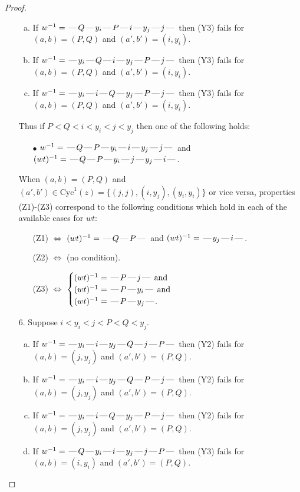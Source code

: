 \documentclass[10pt]{article}
\theoremstyle{definition}
\theoremstyle{definition}
\def\dash{\text{\hspace{0.5mm}---\hspace{0.5mm}}}
\def\Cyc{\mathrm{Cyc}}
\begin{document}
\begin{proof}
\begin{enumerate}
\begin{enumerate}[(a)]
\item If $w^{-1} = \dash Q\dash y_i\dash P\dash i\dash y_j\dash j\dash $ then (Y3) fails for $(a,b)=(P,Q)$ and $(a',b')=(i,y_i)$.
\item If $w^{-1} = \dash y_i\dash Q\dash i\dash y_j\dash P\dash j\dash $ then (Y3) fails for $(a,b)=(P,Q)$ and $(a',b')=(i,y_i)$.
\item If $w^{-1} = \dash y_i\dash i\dash Q\dash y_j\dash P\dash j\dash $ then (Y3) fails for $(a,b)=(P,Q)$ and $(a',b')=(i,y_i)$.
\end{enumerate}
Thus if $P < Q < i < y_i < j < y_j$ then one of the following holds:
\begin{enumerate}
\item[$\bullet$] $w^{-1} = \dash Q\dash P\dash y_i\dash i\dash y_j\dash j\dash $ and $(wt)^{-1} = \dash Q\dash P\dash y_i\dash j\dash y_j\dash i\dash $.
\end{enumerate}
When $(a,b)= (P,Q)$ and $(a',b')\in \Cyc^1(z)=\{(j,j),(i,y_j),(y_i,y_i)\}$ or vice versa,
properties (Z1)-(Z3) correspond to the following conditions which
hold in each of the available cases for $wt$:
\begin{enumerate}
\item[](Z1) $\Leftrightarrow$ $(wt)^{-1} = \dash Q \dash P \dash$  and $(wt)^{-1} = \dash y_j \dash i \dash$.
\item[](Z2) $\Leftrightarrow$ (no condition).
\item[](Z3) $\Leftrightarrow$ $\begin{cases}\text{$(wt)^{-1} = \dash P \dash j \dash$}\text{ and }\\
\text{$(wt)^{-1} = \dash P \dash y_i \dash$}\text{ and }\\
\text{$(wt)^{-1} = \dash P \dash y_j \dash$}.\end{cases}$
\end{enumerate}
\item[$6$.] Suppose $i < y_i < j < P < Q < y_j$.
\begin{enumerate}[(a)]
\item If $w^{-1} = \dash y_i\dash i\dash y_j\dash Q\dash j\dash P\dash $ then (Y2) fails for $(a,b)=(j,y_j)$ and $(a',b')=(P,Q)$.
\item If $w^{-1} = \dash y_i\dash i\dash y_j\dash Q\dash P\dash j\dash $ then (Y2) fails for $(a,b)=(j,y_j)$ and $(a',b')=(P,Q)$.
\item If $w^{-1} = \dash y_i\dash i\dash Q\dash y_j\dash P\dash j\dash $ then (Y2) fails for $(a,b)=(j,y_j)$ and $(a',b')=(P,Q)$.
\item If $w^{-1} = \dash Q\dash y_i\dash i\dash y_j\dash j\dash P\dash $ then (Y3) fails for $(a,b)=(i,y_i)$ and $(a',b')=(P,Q)$.

\end{enumerate}
\end{enumerate}
\end{proof}
\end{document}
